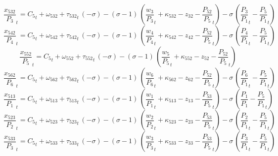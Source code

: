 \begin{dmath}
{{\frac{x_{532}}{P_{3}}}}_{t}={{C_{5}}}_{t}+{{\omega_{532}}}+{{\tau_{532}}}_{t}\, \left(-{{\sigma}}\right)-\left({{\sigma}}-1\right)\, \left({{\frac{w_{3}}{P_{3}}}}_{t}+{{\kappa_{532}}}-{{z_{32}}}-{{\frac{P_{52}}{P_{5}}}}_{t}\right)-{{\sigma}}\, \left({{\frac{P_{3}}{P_{1}}}}_{t}-{{\frac{P_{5}}{P_{1}}}}_{t}\right)
\end{dmath}
\begin{dmath}
{{\frac{x_{542}}{P_{4}}}}_{t}={{C_{5}}}_{t}+{{\omega_{542}}}+{{\tau_{542}}}_{t}\, \left(-{{\sigma}}\right)-\left({{\sigma}}-1\right)\, \left({{\frac{w_{4}}{P_{4}}}}_{t}+{{\kappa_{542}}}-{{z_{42}}}-{{\frac{P_{52}}{P_{5}}}}_{t}\right)-{{\sigma}}\, \left({{\frac{P_{4}}{P_{1}}}}_{t}-{{\frac{P_{5}}{P_{1}}}}_{t}\right)
\end{dmath}
\begin{dmath}
{{\frac{x_{552}}{P_{5}}}}_{t}={{C_{5}}}_{t}+{{\omega_{552}}}+{{\tau_{552}}}_{t}\, \left(-{{\sigma}}\right)-\left({{\sigma}}-1\right)\, \left({{\frac{w_{5}}{P_{5}}}}_{t}+{{\kappa_{552}}}-{{z_{52}}}-{{\frac{P_{52}}{P_{5}}}}_{t}\right)
\end{dmath}
\begin{dmath}
{{\frac{x_{562}}{P_{6}}}}_{t}={{C_{5}}}_{t}+{{\omega_{562}}}+{{\tau_{562}}}_{t}\, \left(-{{\sigma}}\right)-\left({{\sigma}}-1\right)\, \left({{\frac{w_{6}}{P_{6}}}}_{t}+{{\kappa_{562}}}-{{z_{62}}}-{{\frac{P_{52}}{P_{5}}}}_{t}\right)-{{\sigma}}\, \left({{\frac{P_{6}}{P_{1}}}}_{t}-{{\frac{P_{5}}{P_{1}}}}_{t}\right)
\end{dmath}
\begin{dmath}
{{\frac{x_{513}}{P_{1}}}}_{t}={{C_{5}}}_{t}+{{\omega_{513}}}+{{\tau_{513}}}_{t}\, \left(-{{\sigma}}\right)-\left({{\sigma}}-1\right)\, \left({{\frac{w_{1}}{P_{1}}}}_{t}+{{\kappa_{513}}}-{{z_{13}}}-{{\frac{P_{53}}{P_{5}}}}_{t}\right)-{{\sigma}}\, \left({{\frac{P_{1}}{P_{1}}}}-{{\frac{P_{5}}{P_{1}}}}_{t}\right)
\end{dmath}
\begin{dmath}
{{\frac{x_{523}}{P_{2}}}}_{t}={{C_{5}}}_{t}+{{\omega_{523}}}+{{\tau_{523}}}_{t}\, \left(-{{\sigma}}\right)-\left({{\sigma}}-1\right)\, \left({{\frac{w_{2}}{P_{2}}}}_{t}+{{\kappa_{523}}}-{{z_{23}}}-{{\frac{P_{53}}{P_{5}}}}_{t}\right)-{{\sigma}}\, \left({{\frac{P_{2}}{P_{1}}}}_{t}-{{\frac{P_{5}}{P_{1}}}}_{t}\right)
\end{dmath}
\begin{dmath}
{{\frac{x_{533}}{P_{3}}}}_{t}={{C_{5}}}_{t}+{{\omega_{533}}}+{{\tau_{533}}}_{t}\, \left(-{{\sigma}}\right)-\left({{\sigma}}-1\right)\, \left({{\frac{w_{3}}{P_{3}}}}_{t}+{{\kappa_{533}}}-{{z_{33}}}-{{\frac{P_{53}}{P_{5}}}}_{t}\right)-{{\sigma}}\, \left({{\frac{P_{3}}{P_{1}}}}_{t}-{{\frac{P_{5}}{P_{1}}}}_{t}\right)
\end{dmath}
